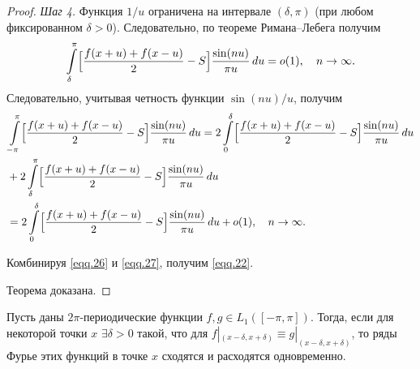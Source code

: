 \begin{proof}
\textit{Шаг 4.}  Функция $1/u$ ограничена на интервале $(\delta,\pi)$ (при любом фиксированном $\delta > 0$). Следовательно, по теореме Римана--Лебега получим
\begin{equation}
	\notag
	\int\limits_{\delta}^{\pi}\Bigl[\frac{f(x+u)+f(x-u)}{2}-S\Bigr]\frac{\sin(nu)}{\pi u}\,du = o(1), \quad n \to \infty.
\end{equation}
Следовательно, учитывая четность функции $\sin(nu)/u$, получим
\begin{equation}
	\label{eqq.27}
	\begin{split}
		&\int\limits_{-\pi}^{\pi}\Bigl[\frac{f(x+u)+f(x-u)}{2}-S\Bigr]\frac{\sin(nu)}{\pi u}\,du = 2\int\limits_{0}^{\delta}\Bigl[\frac{f(x+u)+f(x-u)}{2}-S\Bigr]\frac{\sin(nu)}{\pi u}\,du\\
		& + 2\int\limits_{\delta}^{\pi}\Bigl[\frac{f(x+u)+f(x-u)}{2}-S\Bigr]\frac{\sin(nu)}{\pi u}\,du\\
		&= 2\int\limits_{0}^{\delta}\Bigl[\frac{f(x+u)+f(x-u)}{2}-S\Bigr]\frac{\sin(nu)}{\pi u}\,du + o(1), \quad n \to \infty.
	\end{split}
\end{equation}

Комбинируя \eqref{eqq.26} и \eqref{eqq.27}, получим \eqref{eqq.22}.

Теорема доказана.
\end{proof}

\begin{corollary}
	Пусть даны $2\pi$-периодические функции $f, g \in L_1([-\pi, \pi])$. Тогда, если для некоторой точки $x$ $\exists \delta > 0$ такой, что для $f|_{(x - \delta, x + \delta)} \equiv g|_{(x - \delta, x + \delta)}$, то ряды Фурье этих функций в точке $x$ сходятся и расходятся одновременно.
\end{corollary}
